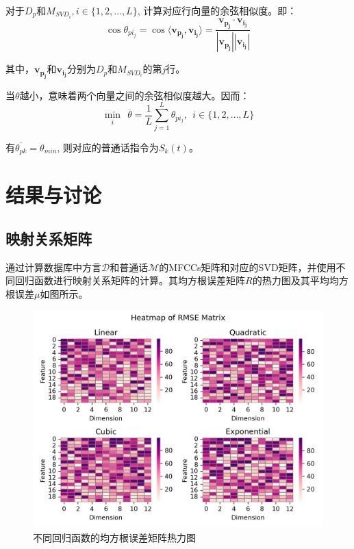 \documentclass[lang=cn,cite=super]{elegantpaper}
\begin{document}
对于$D_p$和$M_{SVD_i}, i \in \{ 1,2,\ldots, L\}$, 计算对应行向量的余弦相似度。即：
\begin{equation}
    \cos \theta_{pi_{j}} = \cos \langle \bm{v_{p_j}},\bm{v_{i_j}} \rangle = \frac{\bm{v_{p_j}} \cdot \bm{v_{i_j}}}{|\bm{v_{p_j}}||\bm{v_{i_j}}|}
\end{equation}

其中，$\bm{v_{p_j}}$和$\bm{v_{i_j}}$分别为$D_p$和$M_{SVD_i}$的第$j$行。

当$\theta$越小，意味着两个向量之间的余弦相似度越大。因而：
\begin{equation}
    \mathop{\min}_{i} ~~\overline{\theta} = \dfrac{1}{L} \sum_{j=1}^{L} \theta_{pi_{j}}, ~~i \in \{1,2,\ldots, L\}
\end{equation}

有$\overline{\theta_{pk}} = \theta_{min}$, 则对应的普通话指令为$S_k(t)$。
\section{结果与讨论}
\subsection{映射关系矩阵}
通过计算数据库中方言$\mathcal{D}$和普通话$\mathcal{M}$的MFCCs矩阵和对应的SVD矩阵，并使用不同回归函数进行映射关系矩阵的计算。其均方根误差矩阵$R$的热力图及其平均均方根误差$\mu$如图所示。
\begin{figure}[h]
    \caption{\label{fig:heatmap_mu}不同回归函数的均方根误差矩阵热力图}
    \centering
    \includegraphics[scale=0.6]{RMatrix.png}
\end{figure}
\end{document}
